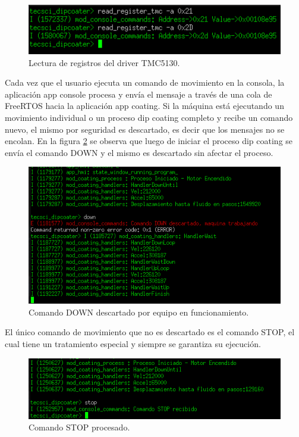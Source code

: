 \begin{figure}[h!]
	\centering
	\includegraphics[width=1\textwidth]{./Figures/consola_6.png}
	\caption{Lectura de registros del driver TMC5130.}
	\label{fig:comando_lectura}
\end{figure}


Cada vez que el usuario ejecuta un comando de movimiento en la consola, la aplicación app console procesa y envía el mensaje a través de una cola de FreeRTOS hacia la aplicación app coating. Si la máquina está ejecutando un movimiento individual o un proceso dip coating completo y recibe un comando nuevo, el mismo por seguridad es descartado, es decir que los mensajes no se encolan. En la figura 
\ref{fig:consola_comando_ok} se observa que luego de iniciar el proceso dip coating se envía el comando DOWN y el mismo es descartado sin afectar el proceso.

\begin{figure}[h!]
	\centering
	\includegraphics[width=1\textwidth]{./Figures/consola_4.png}
	\caption{Comando DOWN descartado por equipo en funcionamiento.}
	\label{fig:consola_comando_ok}
\end{figure}

El único comando de movimiento que no es descartado es el comando STOP, el cual tiene un tratamiento especial y siempre se garantiza su ejecución.

\begin{figure}[h!]
	\centering
	\includegraphics[width=1\textwidth]{./Figures/consola_5.png}
	\caption{Comando STOP procesado.}
	\label{fig:consola_comando_false}
\end{figure}

